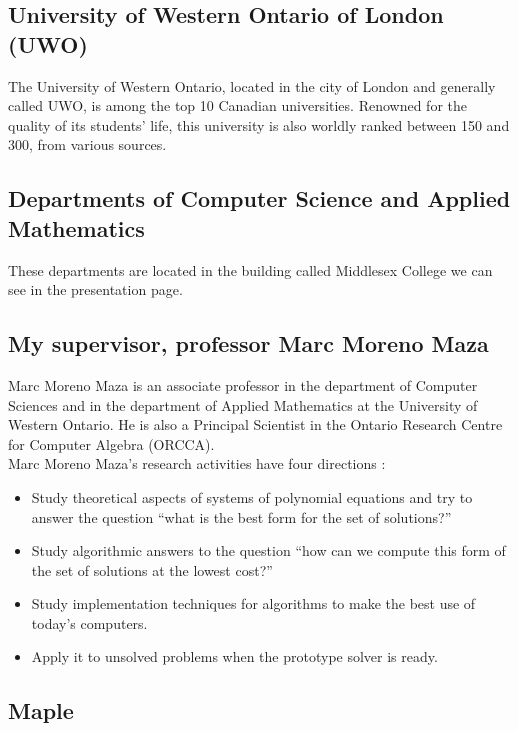 \subsection{University of Western Ontario of London (UWO)}

The University of Western Ontario, located in the city of London and generally called UWO, is among the top 10 Canadian universities.
Renowned for the quality of its students' life,
this university is also worldly ranked between 150 and 300,
from various sources.

\subsection{Departments of Computer Science and Applied Mathematics}
These departments are located in the building called Middlesex College we can see in the presentation page.

\subsection{My supervisor, professor Marc Moreno Maza}

Marc Moreno Maza is an associate professor in the department of Computer Sciences and in the department of Applied Mathematics at the University of Western Ontario. He is also a Principal Scientist in the Ontario Research Centre for Computer Algebra (ORCCA).\\

Marc Moreno Maza's research activities have four directions :\\
\begin{itemize}
\item[\textbullet] Study theoretical aspects of systems of polynomial equations and try to answer the question ``what is the best form for the set of solutions?''
\item[\textbullet] Study algorithmic answers to the question ``how can we compute this form of the set of solutions at the lowest cost?''
\item[\textbullet] Study implementation techniques for algorithms to make the best use of today's computers.
\item[\textbullet] Apply it to unsolved problems when the prototype solver is ready.
\end{itemize}

\subsection{Maple}

